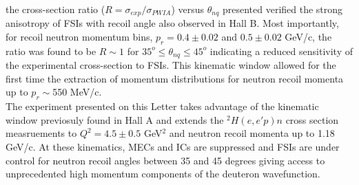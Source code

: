 the cross-section ratio ($R = \sigma_{exp}/\sigma_{PWIA}$) versus $\theta_{nq}$ presented verified the strong anisotropy of FSIs with recoil angle also observed in Hall B\cite{PhysRevLett.98.262502}. Most importantly, for recoil
neutron momentum bins, $p_{r}=0.4\pm0.02$ and $0.5\pm0.02$ GeV/c, the ratio was found to be $R\sim1$ for $35^{o}\leq \theta_{nq}\leq45^{o}$ indicating a reduced sensitivity of the experimental
cross-section to FSIs. This kinematic window allowed for the first time the extraction of momentum distributions for neutron recoil momenta up to $p_{r}\sim$550 MeV/c. \\
\indent The experiment presented on this Letter takes advantage of the kinematic window previosuly found in Hall A\cite{PhysRevLett.107.262501} and extends the $^{2}H(e,e'p)n$ cross section measruements
to $Q^{2}=4.5\pm0.5$ GeV$^{2}$ and neutron recoil momenta up to 1.18 GeV/c. At these kinematics, MECs and ICs are suppressed and FSIs are under control for neutron recoil angles between 35 and 45 degrees
giving access to unprecedented high momentum components of the deuteron wavefunction. \\
